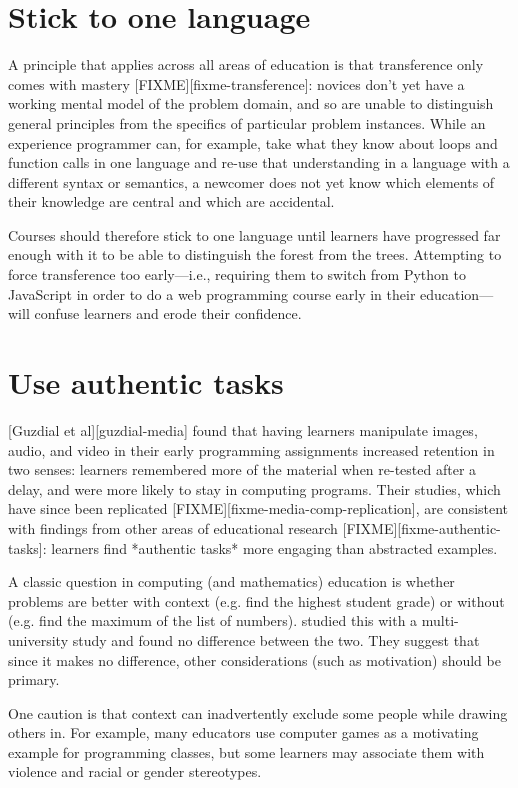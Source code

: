 \documentclass{article}
\begin{document}
\section{Stick to one language}

A principle that applies across all areas of education is that transference only comes with mastery [FIXME][fixme-transference]:
novices don't yet have a working mental model of the problem domain,
and so are unable to distinguish general principles from the specifics of particular problem instances.
While an experience programmer can,
for example,
take what they know about loops and function calls in one language
and re-use that understanding in a language with a different syntax or semantics,
a newcomer does not yet know which elements of their knowledge are central
and which are accidental.

Courses should therefore stick to one language until learners have progressed far enough with it
to be able to distinguish the forest from the trees.
Attempting to force transference too early---i.e.,
requiring them to switch from Python to JavaScript in order to do a web programming course
early in their education---will confuse learners and erode their confidence.

\section{Use authentic tasks}

[Guzdial et al][guzdial-media] found that having learners manipulate images, audio, and video
in their early programming assignments
increased retention in two senses:
learners remembered more of the material when re-tested after a delay,
and were more likely to stay in computing programs.
Their studies,
which have since been replicated [FIXME][fixme-media-comp-replication],
are consistent with findings from other areas of educational research [FIXME][fixme-authentic-tasks]:
learners find *authentic tasks* more engaging than abstracted examples.

A classic question in computing (and mathematics) education is whether problems are better 
with context (e.g. find the highest student grade) or without (e.g. find the maximum of the list of numbers).
\citet{bouvier-context} studied this with a multi-university study and found no difference between
the two.  They suggest that since it makes no difference, other considerations (such as motivation)
should be primary.

One caution is that context can inadvertently exclude some people while drawing others in.
For example,
many educators use computer games as a motivating example for programming classes,
but some learners may associate them with violence and racial or gender stereotypes.
\end{document}
